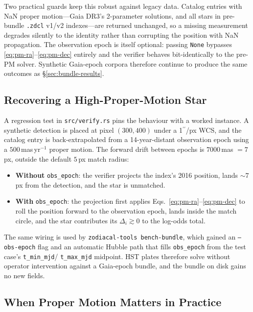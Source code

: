\documentclass[twocolumn, 10pt]{article}
\newcommand{\arcsec}{\ensuremath{^{\prime\prime}}}
\begin{document}
Two practical guards keep this robust against legacy data. Catalog
entries with NaN proper motion---Gaia DR3's 2-parameter solutions, and
all stars in pre-bundle \texttt{.zdcl} v1/v2 indexes---are returned
unchanged, so a missing measurement degrades silently to the identity
rather than corrupting the position with NaN propagation. The
observation epoch is itself optional: passing \texttt{None} bypasses
\eqref{eq:pm-ra}--\eqref{eq:pm-dec} entirely and the verifier behaves
bit-identically to the pre-PM solver. Synthetic Gaia-epoch corpora
therefore continue to produce the same outcomes as
\S\ref{sec:bundle-results}.

\subsection{Recovering a High-Proper-Motion Star} \label{sec:pm-recovery}

A regression test in \texttt{src/verify.rs} pins the behaviour with
a worked instance. A synthetic detection is placed at pixel
$(300, 400)$ under a 1\arcsec/px WCS, and the catalog entry is
back-extrapolated from a 14-year-distant observation epoch using a
$500$\,mas\,yr$^{-1}$ proper motion. The forward drift between
epochs is $7000$\,mas $= 7$\,px, outside the default $5$\,px match
radius:

\begin{itemize}
    \item \textbf{Without} \texttt{obs\_epoch}: the verifier projects
          the index's 2016 position, lands $\sim 7$\,px from the
          detection, and the star is unmatched.
    \item \textbf{With} \texttt{obs\_epoch}: the projection
          first applies Eqs.~\ref{eq:pm-ra}--\ref{eq:pm-dec} to roll
          the position forward to the observation epoch, lands inside
          the match circle, and the star contributes its
          $\Delta_i \gtrsim 0$ to the log-odds total.
\end{itemize}

The same wiring is used by \texttt{zodiacal-tools bench-bundle}, which
gained an \texttt{--obs-epoch} flag and an automatic Hubble path that
fills \texttt{obs\_epoch} from the test case's \texttt{t\_min\_mjd}/
\texttt{t\_max\_mjd} midpoint. HST plates therefore solve without
operator intervention against a Gaia-epoch bundle, and the bundle on
disk gains no new fields.

\subsection{When Proper Motion Matters in Practice} \label{sec:pm-when}
\end{document}
